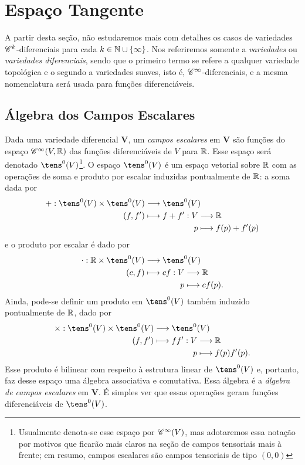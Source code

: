 \section{Espaço Tangente}

A partir desta seção, não estudaremos mais com detalhes os casos de variedades $\mathscr{C}^k$-diferenciais para cada $k \in \mathbb{N} \cup \{\infty\}$. Nos referiremos somente a \emph{variedades} ou \emph{variedades diferenciais}, sendo que o primeiro termo se refere a qualquer variedade topológica e o segundo a variedades suaves, isto é, $\mathscr{C}^\infty$-diferenciais, e a mesma nomenclatura será usada para funções diferenciáveis.

\subsection{Álgebra dos Campos Escalares}

Dada uma variedade diferencial $\bm V$, um \emph{campos escalares} em $\bm V$ são funções do espaço $\mathscr{C}^\infty(V,\mathbb{R})$ das funções diferenciáveis de $V$ para $\mathbb{R}$. Esse espaço será denotado $\tens^0(V)$\footnote{Usualmente denota-se esse espaço por $\mathscr{C}^\infty(V)$, mas adotaremos essa notação por motivos que ficarão mais claros na seção de campos tensoriais mais à frente; em resumo, campos escalares são campos tensoriais de tipo $(0,0)$}. O espaço $\tens^0(V)$ é um espaço vetorial sobre $\mathbb{R}$ com as operações de soma e produto por escalar induzidas pontualmente de $\mathbb{R}$: a soma dada por
	\begin{align*}
	\func{+}{\tens^0(V) \times \tens^0(V)}{\tens^0(V)}{(f,f')}{
		\begin{aligned}[t]
		\func{f+f'}{V}{\R}{p}{f(p)+f'(p)}
		\end{aligned}
		}
	\end{align*}
e o produto por escalar é dado por
	\begin{align*}
	\func{\cdot}{\R \times \tens^0(V)}{\tens^0(V)}{(c,f)}{
		\begin{aligned}[t]
		\func{cf}{V}{\R}{p}{cf(p).}
		\end{aligned}
		}
	\end{align*}
Ainda, pode-se definir um produto em $\tens^0(V)$ também induzido pontualmente de $\mathbb{R}$, dado por
	\begin{align*}
	\func{\times}{\tens^0(V) \times \tens^0(V)}{\tens^0(V)}{(f,f')}{
		\begin{aligned}[t]
		\func{ff'}{V}{\R}{p}{f(p)f'(p).}
		\end{aligned}
		}
	\end{align*}
Esse produto é bilinear com respeito à estrutura linear de $\tens^0(V)$ e, portanto, faz desse espaço uma álgebra associativa e comutativa. Essa álgebra é a \emph{álgebra de campos escalares} em $\bm V$. É simples ver que essas operações geram funções diferenciáveis de $\tens^0(V)$.

